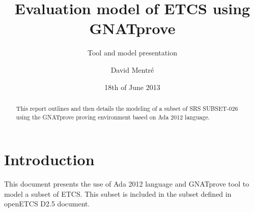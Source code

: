 \documentclass{template/openetcs_report}
\begin{document}
\frontmatter
{}




\title{Evaluation model of ETCS using GNATprove}

\subtitle{Tool and model presentation}

\date{18th of June 2013}

\author{David Mentré}





\begin{abstract}
This report outlines and then details the modeling of a subset of
SRS SUBSET-026 using the GNATprove proving environment based on Ada
2012 language.
\end{abstract}

\maketitle
\tableofcontents
\listoffiguresandtables


\mainmatter

\chapter{Introduction}

This document presents the use of Ada 2012 language and GNATprove tool
to model a subset of ETCS. This subset is included in the subset
defined in openETCS D2.5 document\cite{openetcs:D2.5}.
\end{document}
